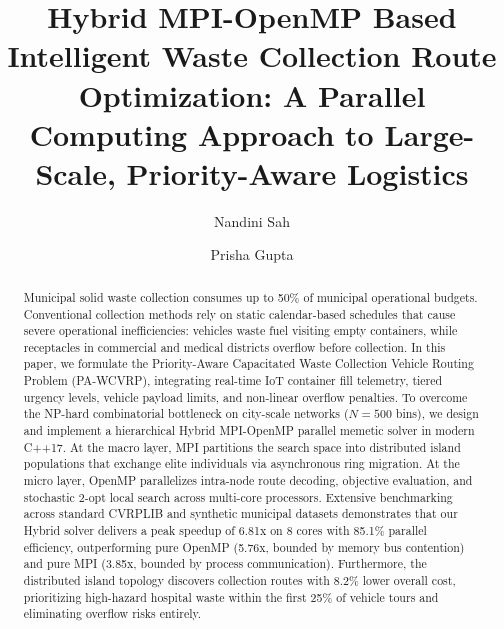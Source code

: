 \documentclass[runningheads]{llncs}
\begin{document}
\title{Hybrid MPI-OpenMP Based Intelligent Waste Collection Route Optimization: A Parallel Computing Approach to Large-Scale, Priority-Aware Logistics}

\author{Nandini Sah \and
Prisha Gupta}



\maketitle

\begin{abstract}
Municipal solid waste collection consumes up to 50\% of municipal operational budgets. Conventional collection methods rely on static calendar-based schedules that cause severe operational inefficiencies: vehicles waste fuel visiting empty containers, while receptacles in commercial and medical districts overflow before collection. In this paper, we formulate the Priority-Aware Capacitated Waste Collection Vehicle Routing Problem (PA-WCVRP), integrating real-time IoT container fill telemetry, tiered urgency levels, vehicle payload limits, and non-linear overflow penalties. To overcome the NP-hard combinatorial bottleneck on city-scale networks ($N=500$ bins), we design and implement a hierarchical Hybrid MPI-OpenMP parallel memetic solver in modern C++17. At the macro layer, MPI partitions the search space into distributed island populations that exchange elite individuals via asynchronous ring migration. At the micro layer, OpenMP parallelizes intra-node route decoding, objective evaluation, and stochastic 2-opt local search across multi-core processors. Extensive benchmarking across standard CVRPLIB and synthetic municipal datasets demonstrates that our Hybrid solver delivers a peak speedup of 6.81x on 8 cores with 85.1\% parallel efficiency, outperforming pure OpenMP (5.76x, bounded by memory bus contention) and pure MPI (3.85x, bounded by process communication). Furthermore, the distributed island topology discovers collection routes with 8.2\% lower overall cost, prioritizing high-hazard hospital waste within the first 25\% of vehicle tours and eliminating overflow risks entirely.

\end{abstract}
\end{document}

